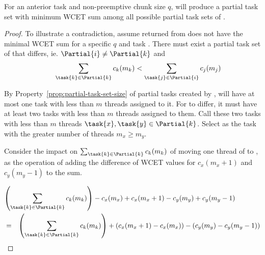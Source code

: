 
%
%

\begin{theorem}
  \label{thm:tpj-wcet-sum}
  For an anterior task  and non-preemptive chunk size ${q}$,
  \texdivide{} will produce a partial task set  with
  minimum WCET sum among all possible partial task sets of .

  \begin{proof} To illustrate a contradiction, assume 
    returned from \texdivide{} does not have the minimal WCET sum
    for a specific ${q}$ and task . There must exist  a partial
    task set  of  that differs, ie. ${\Partial{i}
      \not = \Partial{k}}$ and 
    \begin{equation*}
      \indent
      \sum_{\task{k} \in \Partial{k}} c_k(m_k) <
      \sum_{\task{j} \in \Partial{i}} c_j(m_j)
    \end{equation*}

    By Property~\ref{prop:partial-task-set-size} of partial tasks
    created by \texdivide{},  will have at most one task
    with less than ${m}$ threads assigned to it. For  to
    differ, it must have at least two tasks with less than ${m}$
    threads assigned to them. Call these two tasks with less than
    ${m}$ threads ${\task{x}, \task{y} \in \Partial{k}}$. Select
     as the task with the greater number of threads
    ${m_x \ge m_y}$.

    Consider the impact on ${\sum_{\task{k} \in \Partial{k}}
      c_k(m_k)}$ of moving one thread of  to , as the
    operation of adding the difference of WCET values for
    ${c_x(m_x + 1)}$ and ${c_y(m_y - 1)}$ to the sum. 
    
    \begin{eqnarray*}
      \lefteqn{
      \left(\sum_{\task{k} \in \Partial{k}} c_k(m_k) \right)
      - c_x(m_x) + c_x(m_x + 1)
      - c_y(m_y) + c_y(m_y - 1)} \\
      & = & \left(\sum_{\task{k} \in \Partial{k}} c_k(m_k) \right)
      + (c_x(m_x + 1) - c_x(m_x)) - (c_y(m_y) - c_y(m_y - 1))
    \end{eqnarray*}
    

\end{proof}
\end{theorem}
